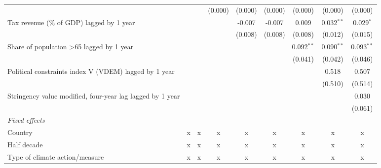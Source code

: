 \begin{tabular}{lcccccccc}
                                                               &              &              & (0.000)       & (0.000)      & (0.000)      & (0.000)      & (0.000)      & (0.000)\\   
   Tax revenue (\% of GDP) lagged by 1 year                    &              &              &               & -0.007       & -0.007       & 0.009        & 0.032$^{**}$ & 0.029$^{*}$\\   
                                                               &              &              &               & (0.008)      & (0.008)      & (0.008)      & (0.012)      & (0.015)\\   
   Share of population >65 lagged by 1 year                    &              &              &               &              &              & 0.092$^{**}$ & 0.090$^{**}$ & 0.093$^{**}$\\   
                                                               &              &              &               &              &              & (0.041)      & (0.042)      & (0.046)\\   
   Political constraints index V (VDEM) lagged by 1 year       &              &              &               &              &              &              & 0.518        & 0.507\\   
                                                               &              &              &               &              &              &              & (0.510)      & (0.514)\\   
   Stringency value modified, four-year lag lagged by 1 year   &              &              &               &              &              &              &              & 0.030\\   
                                                               &              &              &               &              &              &              &              & (0.061)\\   
   \emph{Fixed effects}\\
   Country                                                     & x            & x            & x             & x            & x            & x            & x            & x\\  
   Half decade                                                 & x            & x            & x             & x            & x            & x            & x            & x\\  
   Type of climate action/measure                              & x            & x            & x             & x            & x            & x            & x            & x\\  

\end{tabular}
